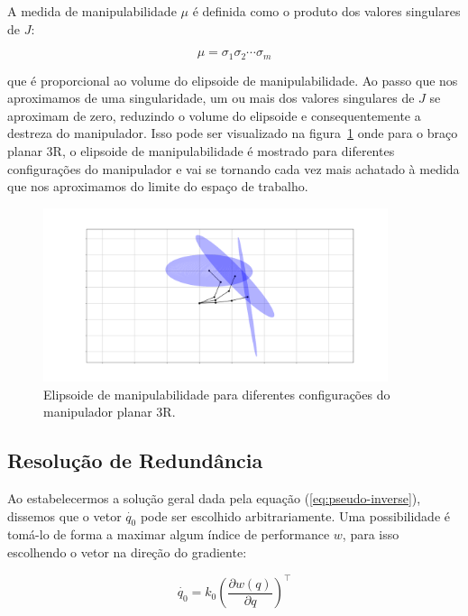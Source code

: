 A medida de manipulabilidade \(\mu\) é definida como o produto dos valores
singulares de \(J\):

\begin{equation}\label{eq:manipulability}
    \mu = \sigma_1 \sigma_2 \cdots \sigma_m
\end{equation}

que é proporcional ao volume do elipsoide de manipulabilidade. Ao passo que nos
aproximamos de uma singularidade, um ou mais dos valores singulares de \(J\) se
aproximam de zero, reduzindo o volume do elipsoide e consequentemente a
destreza do manipulador. Isso pode ser visualizado na
figura~\ref{fig:manipulability-ellipsoid} onde para o braço planar 3R, o
elipsoide de manipulabilidade é mostrado para diferentes configurações do
manipulador e vai se tornando cada vez mais achatado à medida que nos
aproximamos do limite do espaço de trabalho.

\begin{figure}
    \centering
    \includegraphics[width=0.9\textwidth]{Images/3r-ellipsoid.png}
    \caption{Elipsoide de manipulabilidade para diferentes configurações do manipulador planar 3R.}\label{fig:manipulability-ellipsoid}
\end{figure}

\subsection{Resolução de Redundância}

Ao estabelecermos a solução geral dada pela equação (\ref{eq:pseudo-inverse}),
dissemos que o vetor \(\dot{q_0}\) pode ser escolhido arbitrariamente. Uma
possibilidade é tomá-lo de forma a maximar algum índice de performance \(w\),
para isso escolhendo o vetor na direção do gradiente:

\begin{equation}
    \dot{q_0} = k_0 {\left( \frac{\partial w(q)}{\partial q} \right)}^\top
\end{equation}

